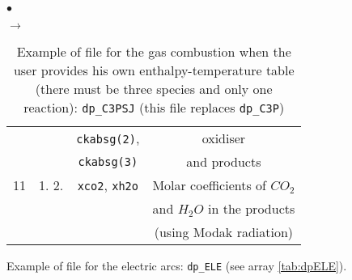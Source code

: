 {{{\begin{list}{$\bullet$}{}
\begin{list}{$\rightarrow$}{}
\begin{table}[htbp]
\begin{center}
{\begin{tabular}{|c|c|c|c|}
        &                                   &                  \texttt{ckabsg(2)}, & oxidiser                                    \\
        &                                   &                  \texttt{ckabsg(3)}  & and products                                \\ \hline
  11    &    1.       2.                    & \texttt{xco2\index{xco2}},   \texttt{xh2o\index{xh2o}}& Molar coefficients of $CO_2$         \\
        &                                   &                             & and $H_2O$ in the products                  \\
        &                                   &                             & (using Modak radiation)                     \\ \hline
\end{tabular}
}
\caption{Example of file for the gas combustion when the user provides
 his own enthalpy-temperature table
                     (there must be three species and only one
                     reaction): \texttt{dp\_C3PSJ} (this file replaces
 \texttt{dp\_C3P})}\label{tab:dpC3PSJ}
\end{center}
\end{table}
        \end{list}

       \item Example of file for the electric arcs: \texttt{dp\_ELE} (see
             array \ref{tab:dpELE}).


\end{list}}}}
